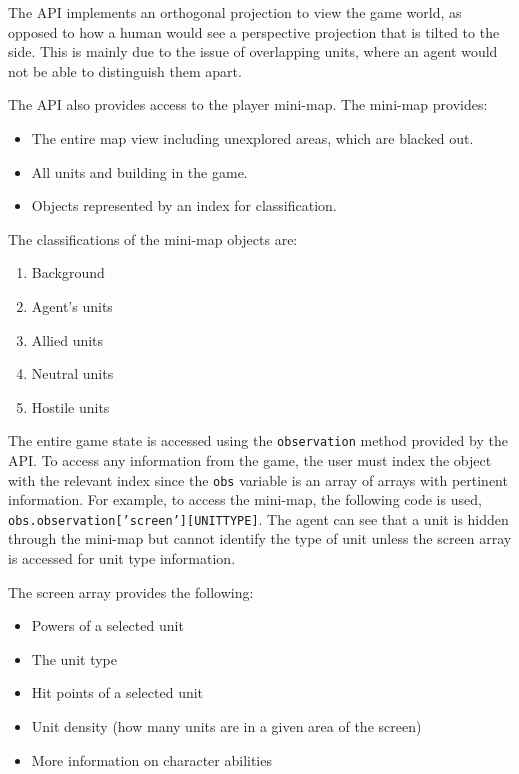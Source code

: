 The API implements an orthogonal projection to view the game world, as opposed
to how a human would see a perspective projection that is tilted to the side.
This is mainly due to the issue of overlapping units, where an agent would not
be able to distinguish them apart.

The API also provides access to the player mini-map. The mini-map provides:

\begin{itemize}
    \item The entire map view including unexplored areas, which are blacked out.
    \item All units and building in the game.
    \item Objects represented by an index for classification.
\end{itemize}

The classifications of the mini-map objects are:
\begin{enumerate}
    \item Background
    \item Agent's units
    \item Allied units
    \item Neutral units
    \item Hostile units
\end{enumerate}

The entire game state is accessed using the \texttt{observation} method provided
by the API\@. To access any information from the game, the user must index the
object with the relevant index since the \texttt{obs} variable is an array of
arrays with pertinent information. For example, to access the mini-map, the
following code is used, \texttt{obs.observation['screen'][UNITTYPE]}. The agent
can see that a unit is hidden through the mini-map but cannot identify the type
of unit unless the screen array is accessed for unit type information.

The screen array provides the following:

\begin{itemize}
    \item Powers of a selected unit
    \item The unit type
    \item Hit points of a selected unit
    \item Unit density (how many units are in a given area of the screen)
    \item More information on character abilities
\end{itemize}

